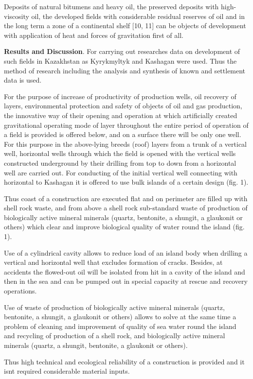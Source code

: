 \begin{multicols}{2}
Deposits of natural bitumens and heavy oil, the preserved deposits with
high-viscosity oil, the developed fields with considerable residual
reserves of oil and in the long term a zone of a continental shelf
{[}10, 11{]} can be objects of development with application of heat and
forces of gravitation first of all.

{\bfseries Results and Discussion}. For carrying out researches data on
development of such fields in Kazakhstan as Kyrykmyltyk and Kashagan
were used. Thus the method of research including the analysis and
synthesis of known and settlement data is used.

For the purpose of increase of productivity of production wells, oil
recovery of layers, environmental protection and safety of objects of
oil and gas production, the innovative way of their opening and
operation at which artificially created gravitational operating mode of
layer throughout the entire period of operation of a field is provided
is offered below, and on a surface there will be only one well. For this
purpose in the above-lying breeds (roof) layers from a trunk of a
vertical well, horizontal wells through which the field is opened with
the vertical wells constructed underground by their drilling from top to
down from a horizontal well are carried out. For conducting of the
initial vertical well connecting with horizontal to Kashagan it is
offered to use bulk islands of a certain design (fig. 1).

Thus coast of a construction are executed flat and on perimeter are
filled up with shell rock waste, and from above a shell rock
sub-standard waste of production of biologically active mineral minerals
(quartz, bentonite, a shungit, a glaukonit or others) which clear and
improve biological quality of water round the island (fig. 1).

Use of a cylindrical cavity allows to reduce load of an island body when
drilling a vertical and horizontal well that excludes formation of
cracks. Besides, at accidents the flowed-out oil will be isolated from
hit in a cavity of the island and then in the sea and can be pumped out
in special capacity at rescue and recovery operations.

Use of waste of production of biologically active mineral minerals
(quartz, bentonite, a shungit, a glaukonit or others) allows to solve at
the same time a problem of cleaning and improvement of quality of sea
water round the island and recycling of production of a shell rock, and
biologically active mineral minerals (quartz, a shungit, bentonite, a
glaukonit or others).

Thus high technical and ecological reliability of a construction is
provided and it isn\textquotesingle t required considerable material
inputs.
\end{multicols}

